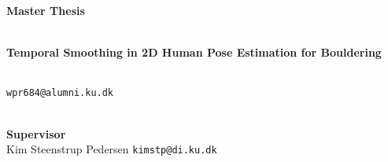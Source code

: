 \documentclass[11pt, a4paper]{article}
\begin{document}
\thispagestyle{empty}

\vspace*{2 cm}
\noindent \textbf{\huge Master Thesis} \\
\vspace*{1 cm} \\

\begin{center}
    \noindent \textbf{\Huge Temporal Smoothing in 2D Human Pose Estimation for Bouldering} \\
\end{center}

\vspace{0.5 cm}

\begin{center}
     \\
    \noindent \texttt{\large wpr684@alumni.ku.dk} \\
    \vspace{0.5 cm}
     \\
    \vspace{2 cm}
\end{center}

\vspace{10 cm}
\noindent \textbf{\large Supervisor} \\
\noindent Kim Steenstrup Pedersen \texttt{kimstp@di.ku.dk}

\clearpage
\ClearWallPaper


\clearpage


\clearpage


\clearpage

\tableofcontents
\clearpage


\clearpage


\clearpage


\clearpage
\end{document}
